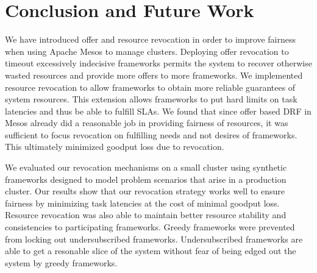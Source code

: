 \section{Conclusion and Future Work}
We have introduced offer and resource revocation in order to improve fairness when using Apache Mesos
to manage clusters. Deploying offer revocation to timeout excessively indecisive frameworks permits the
system to recover otherwise wasted resources and provide more offers to more frameworks. We implemented
resource revocation to allow frameworks to obtain more reliable guarantees of system resources. This
extension allows frameworks to put hard limits on task latencies and thus be able to fulfill SLAs. We
found that since offer based DRF in Mesos already did a reasonable job in providing fairness of
resources, it was sufficient to focus revocation on fulfilling needs and not desires of frameworks. This
ultimately minimized goodput loss due to revocation.

We evaluated our revocation mechanisms on a small cluster using synthetic frameworks designed to model
problem scenarios that arise in a production cluster. Our results show that our revocation strategy
works well to ensure fairness by minimizing task latencies at the cost of minimal goodput loss. Resource
revocation was also able to maintain better resource stability and consistencies to participating
frameworks. Greedy frameworks were prevented from locking out undersubscribed frameworks.
Undersubscribed frameworks are able to get a resonable slice of the system without fear of being edged
out the system by greedy frameworks.
